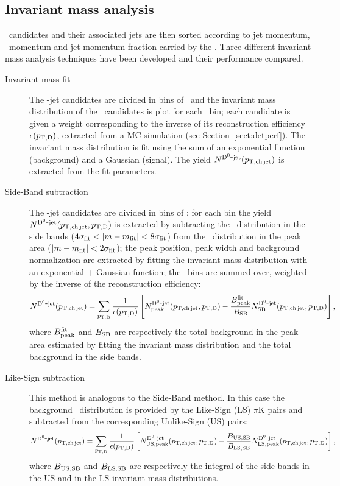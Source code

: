 \documentclass[a4paper]{jpconf}
\begin{document}
\subsection{Invariant mass analysis}
\Dzero\ candidates and their associated jets are then sorted according to jet momentum, \Dzero\ momentum and jet momentum
fraction carried by the \Dzero.
Three different invariant mass analysis techniques have been developed and their performance compared.
\begin{description}
\item[Invariant mass fit] The \Dzero-jet candidates are divided in bins of \ptchjet\ and the invariant mass distribution of the \Dzero\ candidates is plot for each \ptchjet\ bin;
each candidate is given a weight corresponding to the inverse of its reconstruction efficiency $\epsilon(p_{\mathrm{T,D}})$, extracted from a MC simulation (see Section~\ref{sect:detperf}).
The invariant mass distribution is fit using the sum of an exponential function (background) and a Gaussian (signal). The yield $N^{\rm \mathrm{D^{0}}\hbox{-}jet}(p_{\mathrm{T,ch\, jet}})$ is extracted from
the fit parameters.
\item[Side-Band subtraction] The \Dzero-jet candidates are divided in bins of \ptd; for each bin the yield $N^{\rm \mathrm{D^{0}}\hbox{-}jet}(p_{\mathrm{T,ch\, jet}},p_{\mathrm{T,D}})$ is extracted by subtracting the
\ptchjet\ distribution in the side bands ($4\sigma_{\rm fit} < \lvert m - m_{\rm fit} \rvert < 8\sigma_{\rm fit}$) 
from the \ptchjet\ distribution in the peak area ($\lvert m - m_{\rm fit} \rvert < 2\sigma_{\rm fit}$); the peak position, peak width and background normalization are extracted 
by fitting the invariant mass distribution with an exponential + Gaussian function; the \ptd\ bins are summed over, weighted by the inverse of the reconstruction efficiency:
\begin{equation*}
N^{\rm \mathrm{D^{0}}\hbox{-}jet}(p_{\mathrm{T,ch\, jet}})=\sum_{p_{\mathrm{T,D}}} \frac{1}{\epsilon(p_{\mathrm{T,D}})} 
\left[N_{\rm peak}^{\rm \mathrm{D^{0}}\hbox{-}jet}(p_{\mathrm{T,ch\, jet}},p_{\mathrm{T,D}}) - 
\frac{B_{\rm peak}^{\rm fit}}{B_{\rm SB}} 
N_{\rm SB}^{\rm \mathrm{D^{0}}\hbox{-}jet}(p_{\mathrm{T,ch\, jet}},p_{\mathrm{T,D}})\right],
\end{equation*}
where $B_{\rm peak}^{\rm fit}$ and $B_{\rm SB}$ are respectively the total background
in the peak area estimated by fitting the invariant mass distribution and the total
background in the side bands.
\item[Like-Sign subtraction] This method is analogous to the Side-Band method. In this case the background \ptchjet\ distribution is provided by the Like-Sign (LS) $\pi$K pairs and
subtracted from the corresponding Unlike-Sign (US) pairs:
\begin{equation*}
N^{\rm \mathrm{D^{0}}\hbox{-}jet}(p_{\mathrm{T,ch\, jet}})=\sum_{p_{\mathrm{T,D}}} \frac{1}{\epsilon(p_{\mathrm{T,D}})} 
\left[N_{\rm US, peak}^{\rm \mathrm{D^{0}}\hbox{-}jet}(p_{\mathrm{T,ch\, jet}},p_{\mathrm{T,D}}) - 
\frac{B_{\rm US, SB}}{B_{\rm LS, SB}} 
N_{\rm LS, peak}^{\rm \mathrm{D^{0}}\hbox{-}jet}(p_{\mathrm{T,ch\, jet}},p_{\mathrm{T,D}})\right],
\end{equation*}
where $B_{\rm US, SB}$ and $B_{\rm LS, SB}$ are respectively the integral of
the side bands in the US and in the LS invariant mass distributions.
\end{description}
\end{document}
